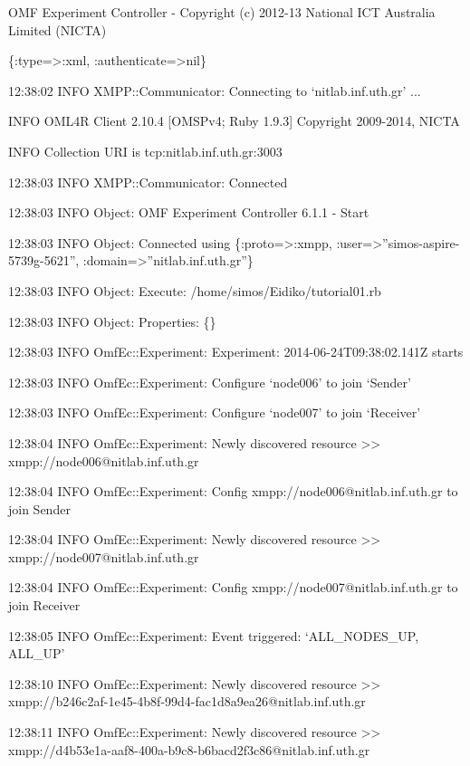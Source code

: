 \documentclass[letterpaper,10pt,english]{sphinxmanual}
\begin{document}
\begin{DUlineblock}{0em}
\item[] OMF Experiment Controller - Copyright (c) 2012-13 National ICT Australia Limited (NICTA)
\item[] \{:type=\textgreater{}:xml, :authenticate=\textgreater{}nil\}
\item[] 12:38:02 INFO  XMPP::Communicator: Connecting to `nitlab.inf.uth.gr' ...
\item[] INFO  OML4R Client 2.10.4 {[}OMSPv4; Ruby 1.9.3{]} Copyright 2009-2014, NICTA
\item[] INFO  Collection URI is tcp:nitlab.inf.uth.gr:3003
\item[] 12:38:03 INFO  XMPP::Communicator: Connected
\item[] 12:38:03 INFO  Object: OMF Experiment Controller 6.1.1 - Start
\item[] 12:38:03 INFO  Object: Connected using \{:proto=\textgreater{}:xmpp, :user=\textgreater{}''simos-aspire-5739g-5621'', :domain=\textgreater{}''nitlab.inf.uth.gr''\}
\item[] 12:38:03 INFO  Object: Execute: /home/simos/Eidiko/tutorial01.rb
\item[] 12:38:03 INFO  Object: Properties: \{\}
\item[] 12:38:03 INFO  OmfEc::Experiment: Experiment: 2014-06-24T09:38:02.141Z starts
\item[] 12:38:03 INFO  OmfEc::Experiment: Configure `node006' to join `Sender'
\item[] 12:38:03 INFO  OmfEc::Experiment: Configure `node007' to join `Receiver'
\item[] 12:38:04 INFO  OmfEc::Experiment: Newly discovered resource \textgreater{}\textgreater{} xmpp://node006@nitlab.inf.uth.gr
\item[] 12:38:04 INFO  OmfEc::Experiment: Config xmpp://node006@nitlab.inf.uth.gr to join Sender
\item[] 12:38:04 INFO  OmfEc::Experiment: Newly discovered resource \textgreater{}\textgreater{} xmpp://node007@nitlab.inf.uth.gr
\item[] 12:38:04 INFO  OmfEc::Experiment: Config xmpp://node007@nitlab.inf.uth.gr to join Receiver
\item[] 12:38:05 INFO  OmfEc::Experiment: Event triggered: `ALL\_NODES\_UP, ALL\_UP'
\item[] 12:38:10 INFO  OmfEc::Experiment: Newly discovered resource \textgreater{}\textgreater{} xmpp://b246c2af-1e45-4b8f-99d4-fac1d8a9ea26@nitlab.inf.uth.gr
\item[] 12:38:11 INFO  OmfEc::Experiment: Newly discovered resource \textgreater{}\textgreater{} xmpp://d4b53e1a-aaf8-400a-b9c8-b6bacd2f3c86@nitlab.inf.uth.gr

\end{DUlineblock}
\end{document}
